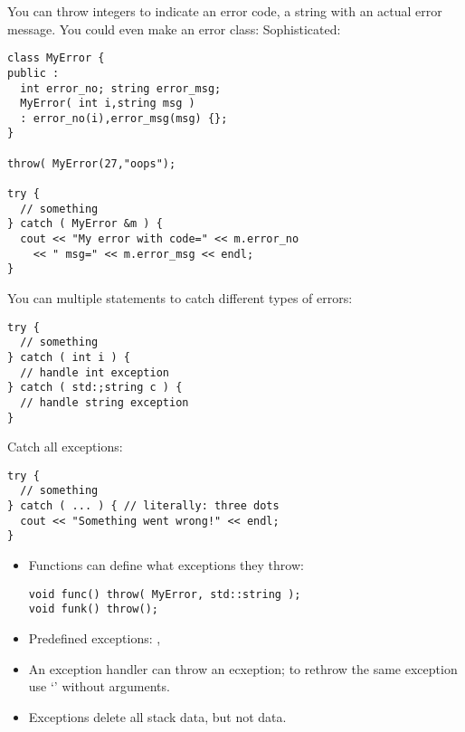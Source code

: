 You can throw integers to indicate an error code, a string with an
actual error message. You could even make an error class:
Sophisticated:
\begin{verbatim}
class MyError {
public :
  int error_no; string error_msg;
  MyError( int i,string msg )
  : error_no(i),error_msg(msg) {};
}

throw( MyError(27,"oops");

try {
  // something
} catch ( MyError &m ) {
  cout << "My error with code=" << m.error_no
    << " msg=" << m.error_msg << endl;
}
\end{verbatim}

You can multiple  statements to catch different types of
errors:
\begin{verbatim}
try {
  // something
} catch ( int i ) {
  // handle int exception
} catch ( std:;string c ) {
  // handle string exception
}
\end{verbatim}

Catch all exceptions:
\begin{verbatim}
try {
  // something
} catch ( ... ) { // literally: three dots
  cout << "Something went wrong!" << endl;
}
\end{verbatim}

\begin{itemize}
\item Functions can define what exceptions they throw: 
\begin{verbatim}
void func() throw( MyError, std::string );
void funk() throw();
\end{verbatim}
\item Predefined exceptions: ,
\item An exception handler can throw an ecxeption; to rethrow the same
  exception use `' without arguments.
\item Exceptions delete all stack data, but not  data.
\end{itemize}

